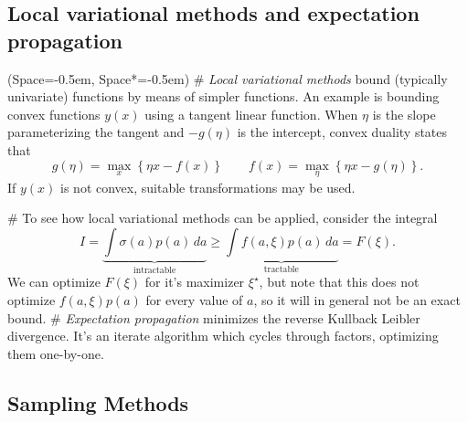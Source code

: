 \documentclass[12pt, a4paper]{article}
\newcommand{\listSpace}{-0.5em}%
\begin{document}
\subsection*{Local variational methods and expectation propagation}
\begin{easylist}[itemize]
	\ListProperties(Space=\listSpace, Space*=\listSpace)
	# \emph{Local variational methods} bound (typically univariate) functions by means of simpler functions.
	An example is bounding convex functions $y(x)$ using a tangent linear function.
	When $\eta$ is the slope parameterizing the tangent and $-g(\eta)$ is the intercept, convex duality states that
	\begin{equation*}
		g(\eta) = \max_x \left\{ \eta x - f(x) \right\}
		\qquad 
		f(x) = \max_\eta \left\{ \eta x - g(\eta) \right\}.
	\end{equation*}
	If $y(x)$ is not convex, suitable transformations may be used.
	
	# To see how local variational methods can be applied, consider the integral
	\begin{equation*}
		I = \underbrace{\int \sigma(a) p (a) \, da}_{\text{intractable}} \geq 
		\underbrace{\int f(a, \xi) p (a) \, da}_{\text{tractable}} = F(\xi).
	\end{equation*}
	We can optimize $F(\xi)$ for it's maximizer $\xi^{\star}$, but note that this does not optimize $f(a, \xi) p (a)$ for every value of $a$, so it will in general not be an exact bound.
	# \emph{Expectation propagation} minimizes the reverse Kullback Leibler divergence. 
	It's an iterate algorithm which cycles through factors, optimizing them one-by-one.
\end{easylist}

\subsection{Sampling Methods}
\end{document}
